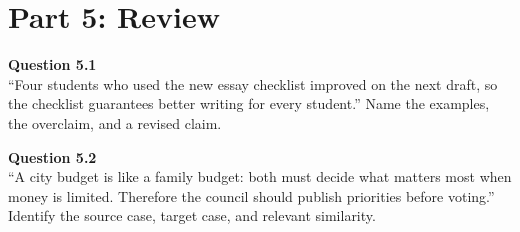 \documentclass[12pt]{article}
\begin{document}

\newpage

\section*{Part 5: Review}

\textbf{Question 5.1}\\[-0.15em]
``Four students who used the new essay checklist improved on the next draft, so the checklist guarantees better writing for every student.'' Name the examples, the overclaim, and a revised claim.


\textbf{Question 5.2}\\[-0.15em]
``A city budget is like a family budget: both must decide what matters most when money is limited. Therefore the council should publish priorities before voting.'' Identify the source case, target case, and relevant similarity.

\end{document}
